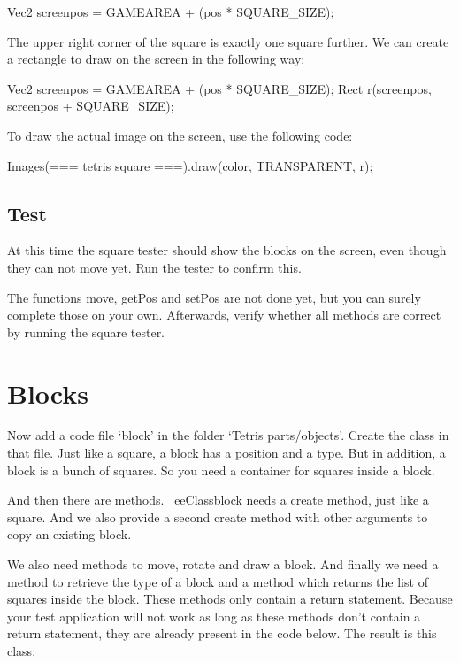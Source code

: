 \begin{code}
Vec2 screenpos = GAMEAREA + (pos * SQUARE_SIZE);
\end{code}

The upper right corner of the square is exactly one square further. We can create a rectangle to draw on the screen in the following way:

\begin{code}
Vec2 screenpos = GAMEAREA + (pos * SQUARE_SIZE);
Rect r(screenpos, screenpos + SQUARE_SIZE);
\end{code}

To draw the actual image on the screen, use the following code: 

\begin{code}
Images(=== tetris square ===).draw(color, TRANSPARENT, r);
\end{code}

\subsection{Test}
At this time the square tester should show the blocks on the screen, even though they can not move yet. Run the tester to confirm this.

The functions move, getPos and setPos are not done yet, but you can surely complete those on your own. Afterwards, verify whether all methods are correct by running the square tester.

\section{Blocks}
Now add a code file `block' in the folder `Tetris parts/objects'. Create the class  in that file. Just like a square, a block has a position and a type. But in addition, a block is a bunch of squares. So you need a container for squares inside a block.

And then there are methods. \ eeClass{block} needs a create method, just like a square. And we also provide a second create method with other arguments to copy an existing block.

We also need methods to move, rotate and draw a block. And finally we need a method to retrieve the type of a block and a method which returns the list of squares inside the block. These methods only contain a return statement. Because your test application will not work as long as these methods don't contain a return statement, they are already present in the code below. The result is this class:

